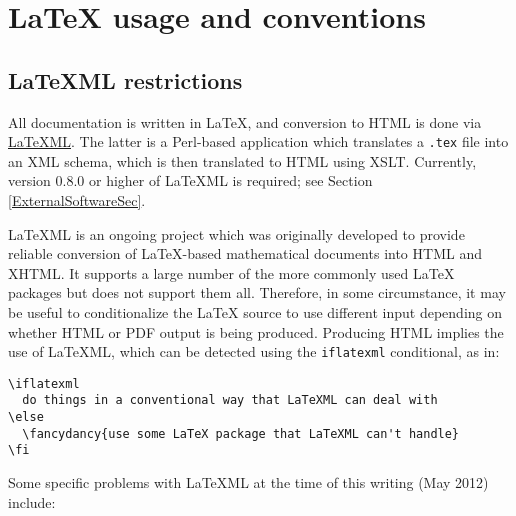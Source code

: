 \documentclass{article}
\begin{document}
\section{LaTeX usage and conventions}

\label{LatexUsage}

\subsection{LaTeXML restrictions}

All documentation is written in LaTeX, and conversion to HTML is done
via \href{http://dlmf.nist.gov/LaTeXML/}{LaTeXML}.  The latter is a
Perl-based application which translates a {\tt .tex} file into an XML
schema, which is then translated to HTML using XSLT. Currently,
version 0.8.0 or higher of LaTeXML is required; see 
Section \ref{ExternalSoftwareSec}.

LaTeXML is an ongoing project which was originally developed to
provide reliable conversion of LaTeX-based mathematical documents into
HTML and XHTML. It supports a large number of the more commonly used
LaTeX packages but does not support them all. Therefore, in some
circumstance, it may be useful to conditionalize the LaTeX source to
use different input depending on whether HTML or PDF output is being
produced. Producing HTML implies the use of LaTeXML, which can be
detected using the {\tt \BKS iflatexml} conditional, as in:

\begin{lstlisting}[]
\iflatexml
  do things in a conventional way that LaTeXML can deal with
\else
  \fancydancy{use some LaTeX package that LaTeXML can't handle}
\fi
\end{lstlisting}

Some specific problems with LaTeXML at the time of this writing
(May 2012) include:
\end{document}
